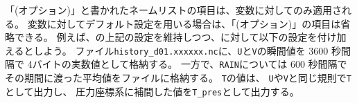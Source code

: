 「(オプション)」と書かれたネームリストの項目は、変数に対してのみ適用される。
変数に対してデフォルト設定を用いる場合は、「(オプション)」の項目は省略できる。
例えば、の上記の設定を維持しつつ、に対して以下の設定を付け加えるとしよう。
ファイル\verb|history_d01.xxxxxx.nc|に、\verb|U|と\verb|V|の瞬間値を 3600 秒間隔で 4バイトの実数値として格納する。
一方で、\verb|RAIN|については 600 秒間隔でその期間に渡った平均値をファイルに格納する。
\verb|T|の値は、 \verb|U|や\verb|V|と同じ規則で\verb|T|として出力し、
圧力座標系に補間した値を\verb|T_pres|として出力する。


